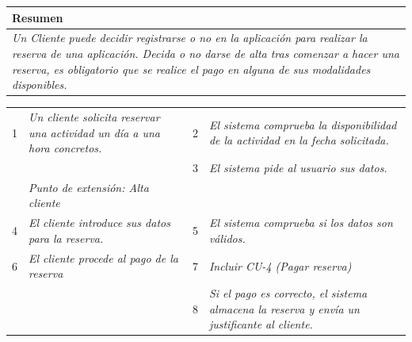     \begin{table}[H]
        \begin{tabular}{llllllll}
    \hline
    \multicolumn{8}{|l|}{\cellcolor[HTML]{F2F2F2}Resumen}                                                                                                                                                                                                                                                                                                                                                                                             \\ \hline
    \multicolumn{8}{|p{15cm}|}{{\color[HTML]{808080} \textit{Un Cliente puede decidir registrarse o no en la aplicación para realizar la reserva de una aplicación. Decida o no darse de alta tras comenzar a hacer una reserva, es obligatorio que se realice el pago en alguna de sus modalidades disponibles.}}} \\ \hline
    \end{tabular}
    \end{table}




\begin{table}[h!]
    \centering
    \begin{tabular}{|p{0.6cm}|p{6.5cm}|p{0.6cm}|p{6.5cm}|}
    \rowcolor{lightgray}
    \hline
    \multicolumn{4}{|l|}{Curso Normal (Básico)} \\
    \hline
    1 & \color[HTML]{808080}\textit{Un cliente solicita reservar una actividad un día a una hora concretos.} & 2 & \color[HTML]{808080}\textit{El sistema comprueba la disponibilidad de la actividad en la fecha solicitada.} \\
    \hline
    & & 3 & \color[HTML]{808080}\textit{El sistema pide al usuario sus datos.} \\
    \hline
    & \color[HTML]{808080}\textit{Punto de extensión: Alta cliente} & & \\
    \hline
    4 & \color[HTML]{808080}\textit{El cliente introduce sus datos para la reserva.} & 5 & \color[HTML]{808080}\textit{El sistema comprueba si los datos son válidos.} \\
    \hline
    6 & \color[HTML]{808080}\textit{El cliente procede al pago de la reserva} & 7 & \color[HTML]{808080}\textit{Incluir CU-4 (Pagar reserva)} \\
    \hline
    & & 8 & \color[HTML]{808080}\textit{Si el pago es correcto, el sistema almacena la reserva y envía un justificante al cliente.} \\
    \hline
    \end{tabular}
    \end{table}


